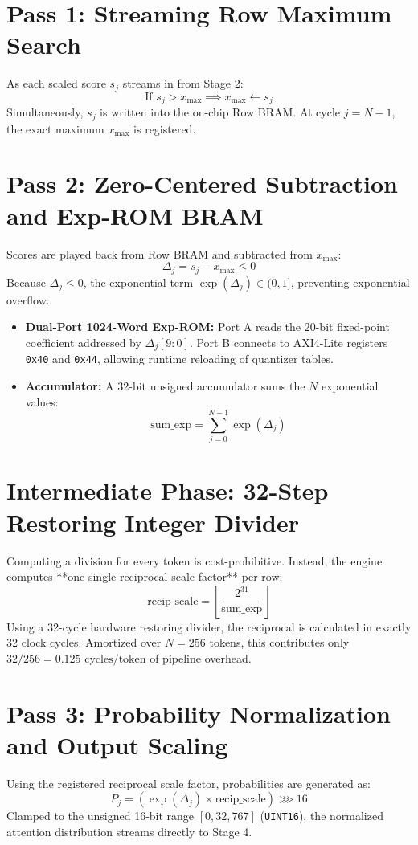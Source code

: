 \section{Pass 1: Streaming Row Maximum Search}
As each scaled score $s_j$ streams in from Stage 2:
\begin{equation}
    \text{If } s_j > x_{\max} \implies x_{\max} \leftarrow s_j
\end{equation}
Simultaneously, $s_j$ is written into the on-chip Row BRAM. At cycle $j = N-1$, the exact maximum $x_{\max}$ is registered.

\section{Pass 2: Zero-Centered Subtraction and Exp-ROM BRAM}
Scores are played back from Row BRAM and subtracted from $x_{\max}$:
\begin{equation}
    \Delta_j = s_j - x_{\max} \le 0
\end{equation}
Because $\Delta_j \le 0$, the exponential term $\exp(\Delta_j) \in (0, 1]$, preventing exponential overflow.
\begin{itemize}
    \item \textbf{Dual-Port 1024-Word Exp-ROM:} Port A reads the 20-bit fixed-point coefficient addressed by $\Delta_j[9:0]$. Port B connects to AXI4-Lite registers \texttt{0x40} and \texttt{0x44}, allowing runtime reloading of quantizer tables.
    \item \textbf{Accumulator:} A 32-bit unsigned accumulator sums the $N$ exponential values:
    \begin{equation}
        \text{sum\_exp} = \sum_{j=0}^{N-1} \exp(\Delta_j)
    \end{equation}
\end{itemize}

\section{Intermediate Phase: 32-Step Restoring Integer Divider}
Computing a division for every token is cost-prohibitive. Instead, the engine computes **one single reciprocal scale factor** per row:
\begin{equation}
    \text{recip\_scale} = \left\lfloor \frac{2^{31}}{\text{sum\_exp}} \right\rfloor
\end{equation}
Using a 32-cycle hardware restoring divider, the reciprocal is calculated in exactly 32 clock cycles. Amortized over $N=256$ tokens, this contributes only $32 / 256 = 0.125\text{ cycles/token}$ of pipeline overhead.

\section{Pass 3: Probability Normalization and Output Scaling}
Using the registered reciprocal scale factor, probabilities are generated as:
\begin{equation}
    P_j = \left( \exp(\Delta_j) \times \text{recip\_scale} \right) \ggg 16
\end{equation}
Clamped to the unsigned 16-bit range $[0, 32,767]$ (\texttt{UINT16}), the normalized attention distribution streams directly to Stage 4.

